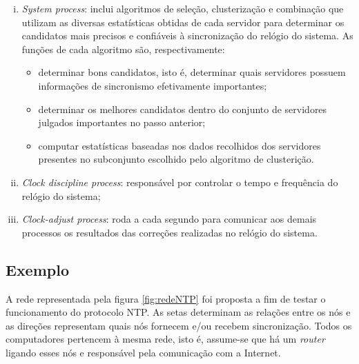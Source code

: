 \begin {enumerate}[i.]
	O \textit{poll process} é responsável, por sua vez, por enviar pacotes aos
	servidores a cada intervalo de \(2^\tau\) segundos. \(\tau\) varia de 4 a 17,
	resultando, assim, em intervalos de 16 segundos a 36 horas. O valor de \(\tau\)
	pode variar durante a execução, sendo modificado pelo algoritmo regulador do
	relógio, que será discutido posteriormente. 
	
	\item \textit{System process}: inclui algoritmos de seleção, clusterização e
	combinação que utilizam as diversas estatísticas obtidas de cada servidor para
	determinar os candidatos mais precisos e confiáveis à sincronização do relógio
	do sistema. As funções de cada algoritmo são, respectivamente:
		
		\begin{itemize}
  		  \renewcommand\labelitemi{--}
  		  \item determinar bons candidatos, isto é, determinar quais servidores
  		  possuem informações de sincronismo efetivamente importantes;
  		  \item determinar os melhores candidatos dentro do conjunto de servidores
  		  julgados importantes no passo anterior;
  		  \item computar estatísticas baseadas nos dados recolhidos dos servidores
  		  presentes no subconjunto escolhido pelo algoritmo de clusterição.
  		\end{itemize}
  	
  	\item \textit{Clock discipline process}: responsável por controlar o tempo e
  	frequência do relógio do sistema;
  	
  	\item \textit{Clock-adjust process}: roda a cada segundo para comunicar aos
  	demais processos os resultados das correções realizadas no relógio do
  	sistema.
  	
\end{enumerate}

\subsection {Exemplo}

A rede representada pela figura \ref{fig:redeNTP} foi proposta a fim de testar o
funcionamento do protocolo NTP. As setas determinam as relações entre os nós e
as direções representam quais nós fornecem e/ou recebem sincronização. Todos os
computadores pertencem à mesma rede, isto é, assume-se que há um \textit{router}
ligando esses nós e responsável pela comunicação com a Internet.

